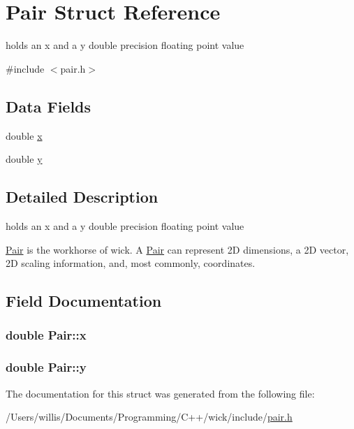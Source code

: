 \hypertarget{struct_pair}{\section{Pair Struct Reference}
\label{struct_pair}
}


holds an x and a y double precision floating point value  




{\ttfamily \#include $<$pair.\-h$>$}

\subsection*{Data Fields}
\begin{DoxyCompactItemize}
\item 
double \hyperlink{struct_pair_a55c43e6bd21b0ad7d2bf68cfb4c7ac92}{x}
\item 
double \hyperlink{struct_pair_ab3424a2a17d590cfe3d8dd75d44581c3}{y}
\end{DoxyCompactItemize}


\subsection{Detailed Description}
holds an x and a y double precision floating point value 

\hyperlink{struct_pair}{Pair} is the workhorse of wick. A \hyperlink{struct_pair}{Pair} can represent 2\-D dimensions, a 2\-D vector, 2\-D scaling information, and, most commonly, coordinates. 

\subsection{Field Documentation}
\hypertarget{struct_pair_a55c43e6bd21b0ad7d2bf68cfb4c7ac92}{
\subsubsection[{x}]{\setlength{\rightskip}{0pt plus 5cm}double Pair\-::x}}\label{struct_pair_a55c43e6bd21b0ad7d2bf68cfb4c7ac92}
\hypertarget{struct_pair_ab3424a2a17d590cfe3d8dd75d44581c3}{
\subsubsection[{y}]{\setlength{\rightskip}{0pt plus 5cm}double Pair\-::y}}\label{struct_pair_ab3424a2a17d590cfe3d8dd75d44581c3}


The documentation for this struct was generated from the following file\-:\begin{DoxyCompactItemize}
\item 
/\-Users/willis/\-Documents/\-Programming/\-C++/wick/include/\hyperlink{pair_8h}{pair.\-h}\end{DoxyCompactItemize}
